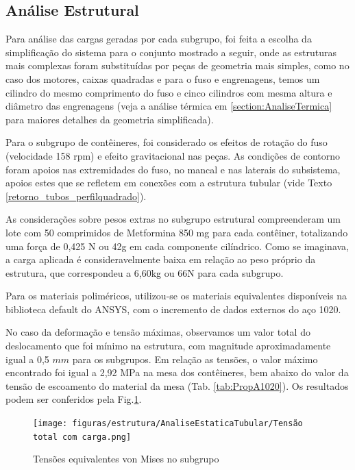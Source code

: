 \subsection{Análise Estrutural}
    
Para análise das cargas geradas por cada subgrupo, foi feita a escolha da simplificação do sistema para o conjunto mostrado a seguir, onde as estruturas mais complexas foram substituídas por peças de geometria mais simples, como no caso dos motores, caixas quadradas e para o fuso e engrenagens, temos um cilindro do mesmo comprimento do fuso e cinco cilindros com mesma altura e diâmetro das engrenagens (veja a análise térmica em \ref{section:AnaliseTermica} para maiores detalhes da geometria simplificada).


Para o subgrupo de contêineres, foi considerado os efeitos de rotação do fuso (velocidade 158 rpm) e efeito gravitacional nas peças. As condições de contorno foram apoios nas extremidades do fuso, no mancal e nas laterais do subsistema, apoios estes que se refletem em conexões com a estrutura tubular (vide Texto \ref{retorno_tubos_perfilquadrado}). 

As considerações sobre pesos extras no subgrupo estrutural compreenderam um lote com 50 comprimidos de Metformina 850 mg para cada contêiner, totalizando uma força de 0,425 N ou 42g em cada componente cilíndrico. Como se imaginava, a carga aplicada é consideravelmente baixa em relação ao peso próprio da estrutura, que correspondeu a 6,60kg ou 66N para cada subgrupo. 

Para os materiais poliméricos, utilizou-se os materiais equivalentes disponíveis na biblioteca default do ANSYS, com o incremento de dados externos do aço 1020.

No caso da deformação e tensão máximas, observamos um valor total do deslocamento que foi mínimo na estrutura, com magnitude aproximadamente igual a 0,5 $mm$ para os subgrupos. Em relação as tensões, o valor máximo encontrado foi igual a 2,92 MPa na mesa dos contêineres, bem abaixo do valor da tensão de escoamento do material da mesa (Tab. \ref{tab:PropA1020}). Os resultados podem ser conferidos pela Fig.\ref{fig:tensao_subgrupo}.

\begin{figure}[H]
    \centering
    \texttt{[image: figuras/estrutura/AnaliseEstaticaTubular/Tensão total com carga.png]}
    \caption{Tensões equivalentes von Mises no subgrupo }
    \label{fig:tensao_subgrupo}
\end{figure}

